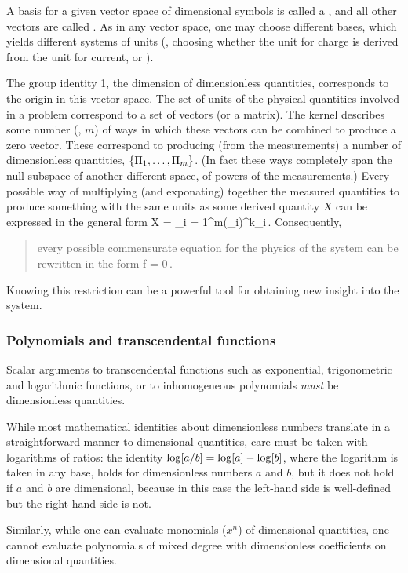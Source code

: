 A basis for a given vector space of dimensional symbols is called a , and all other vectors are called . As in any vector space, one may choose different bases, which yields different systems of units (\eg, choosing whether the unit for charge is derived from the unit for current, or \vis).

The group identity 1, the dimension of dimensionless quantities, corresponds to the origin in this vector space.
The set of units of the physical quantities involved in a problem correspond to a set of vectors (or a matrix). The kernel describes some number (\eg, $m$) of ways in which these vectors can be combined to produce a zero vector. These correspond to producing (from the measurements) a number of dimensionless quantities, $\left\lbrace{\Pi_1,\dotsc,\Pi_m}\right\rbrace$. (In fact these ways completely span the null subspace of another different space, of powers of the measurements.) Every possible way of multiplying (and exponating) together the measured quantities to produce something with the same units as some derived quantity $X$ can be expressed in the general form 
\beq
X = \prod_{i = 1}^{m}\left(\kdim_i\right)^{k_i}\,.
\eeq
Consequently, 
\begin{quote}
every possible commensurate equation for the physics of the system can be rewritten in the form 
\beq
f = 0\,.
\eeq 
\end{quote}
Knowing this restriction can be a powerful tool for obtaining new insight into the system.


\subsubsection{Polynomials and transcendental functions}
Scalar arguments to transcendental functions such as exponential, trigonometric and logarithmic functions, or to inhomogeneous polynomials \emph{must} be dimensionless quantities. 

While most mathematical identities about dimensionless numbers translate in a straightforward manner to dimensional quantities, care must be taken with logarithms of ratios: the identity $\log\!\left[{a/b}\right] = \log\!\left[{a}\right] - \log\!\left[{b}\right]$, where the logarithm is taken in any base, holds for dimensionless numbers $a$ and $b$, but it does not hold if $a$ and $b$ are dimensional, because in this case the left-hand side is well-defined but the right-hand side is not.

Similarly, while one can evaluate monomials ($x^n$) of dimensional quantities, one cannot evaluate polynomials of mixed degree with dimensionless coefficients on dimensional quantities.


